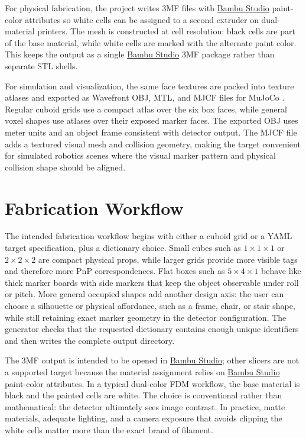 \documentclass[conference]{IEEEtran}
\newcommand{\BambuStudio}{\href{https://github.com/bambulab/BambuStudio}{Bambu Studio}}
\begin{document}
For physical fabrication, the project writes 3MF files with \BambuStudio{} paint-color attributes so white cells can be assigned to a second extruder on dual-material printers. The mesh is constructed at cell resolution: black cells are part of the base material, while white cells are marked with the alternate paint color. This keeps the output as a single \BambuStudio{} 3MF package rather than separate STL shells.

For simulation and visualization, the same face textures are packed into texture atlases and exported as Wavefront OBJ, MTL, and MJCF files for MuJoCo \cite{mujoco}. Regular cuboid grids use a compact atlas over the six box faces, while general voxel shapes use atlases over their exposed marker faces. The exported OBJ uses meter units and an object frame consistent with detector output. The MJCF file adds a textured visual mesh and collision geometry, making the target convenient for simulated robotics scenes where the visual marker pattern and physical collision shape should be aligned.

\section{Fabrication Workflow}
The intended fabrication workflow begins with either a cuboid grid or a YAML target specification, plus a dictionary choice. Small cubes such as \(1\times1\times1\) or \(2\times2\times2\) are compact physical props, while larger grids provide more visible tags and therefore more PnP correspondences. Flat boxes such as \(5\times4\times1\) behave like thick marker boards with side markers that keep the object observable under roll or pitch. More general occupied shapes add another design axis: the user can choose a silhouette or physical affordance, such as a frame, chair, or stair shape, while still retaining exact marker geometry in the detector configuration. The generator checks that the requested dictionary contains enough unique identifiers and then writes the complete output directory.

The 3MF output is intended to be opened in \BambuStudio{}; other slicers are not a supported target because the material assignment relies on \BambuStudio{} paint-color attributes. In a typical dual-color FDM workflow, the base material is black and the painted cells are white. The choice is conventional rather than mathematical: the detector ultimately sees image contrast. In practice, matte materials, adequate lighting, and a camera exposure that avoids clipping the white cells matter more than the exact brand of filament.
\end{document}
